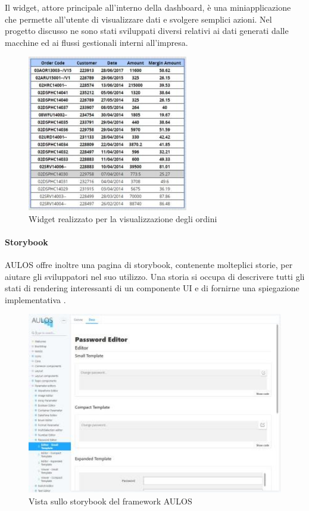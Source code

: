 \pagebreak
Il widget, attore principale all'interno della dashboard,
è una miniapplicazione che permette all'utente di visualizzare dati e svolgere semplici azioni. Nel progetto discusso ne sono stati sviluppati diversi relativi ai dati generati dalle macchine ed ai flussi gestionali interni all'impresa.
\begin{figure}[h]
\begin{center}
  \includegraphics[width=7cm]{images/orders_widget.jpg}
  \caption{Widget realizzato per la visualizzazione degli ordini}
\end{center}
\end{figure}
\paragraph{Storybook}
AULOS offre inoltre una pagina di storybook, contenente molteplici storie, per aiutare gli sviluppatori nel suo utilizzo. Una storia si occupa di descrivere tutti gli stati di rendering interessanti di un componente UI e di fornirne una spiegazione implementativa \cite{STORYBOOK}.
\pagebreak
\begin{figure}[h]
\begin{center}
  \includegraphics[width=14cm]{images/aulos_storybook.JPG}
  \caption{Vista sullo storybook del framework AULOS}
\end{center}
\end{figure}

